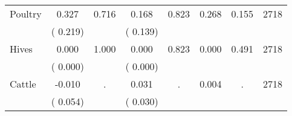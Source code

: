 \begin{tabular}{l*{7}{c}}
 Poultry       &              0.327       &        0.716  &              0.168       &        0.823  &              0.268       &              0.155 &  2718 \\ 
                       &       (       0.219)             &                               &       (       0.139)                     &                               &                                               &                                &                      \\ 

 Hives       &              0.000       &        1.000  &              0.000       &        0.823  &              0.000       &              0.491 &  2718 \\ 
                       &       (       0.000)             &                               &       (       0.000)                     &                               &                                               &                                &                      \\ 

 Cattle       &             -0.010       &            .  &              0.031       &            .  &              0.004       &                  . &  2718 \\ 
                       &       (       0.054)             &                               &       (       0.030)                     &                               &                                               &                                &                      \\ 

\hline \end{tabular}